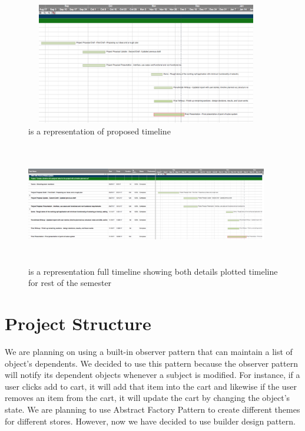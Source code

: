 \documentclass[10pt,conference,onecolumn,compsoc]{IEEEtran}
\begin{document}
\begin{figure}[H]
\includegraphics[height=200px, width=400px]{new1}
\caption{is a  representation of proposed timeline}
\label{timeline}
\end{figure}

\begin{figure}[H]
\includegraphics[height=200px, width=400px]{new2}
\caption{is a  representation full timeline showing both details plotted timeline for rest of the semester}
\label{fullPT}
\end{figure}


\section{Project Structure}
We are planning on using a built-in observer pattern that can maintain a list of object's dependents. We decided to use this pattern because the observer pattern will notify its dependent objects whenever a subject is modified. For instance, if a user clicks add to cart, it will add that item into the cart and likewise if the user removes an item from the cart, it will update the cart by changing the object's state. We are planning to use Abstract Factory Pattern to create different themes for different stores. However, now we have decided to use builder design pattern. 
\end{document}
